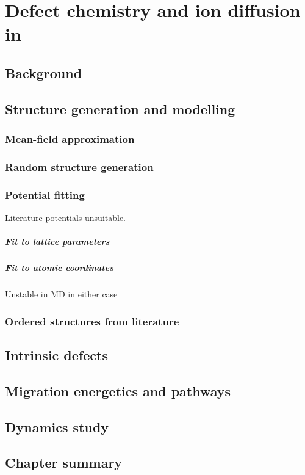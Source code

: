 \chapter{Defect chemistry and  ion diffusion in }
\section{Background}

\section{Structure generation and modelling}
\subsection{Mean-field approximation}

\subsection{Random structure generation}
\subsection{Potential fitting}
Literature potentials unsuitable.
\paragraph{Fit to lattice parameters}
\paragraph{Fit to atomic coordinates}
Unstable in MD in either case

\subsection{Ordered structures from literature}

\section{Intrinsic defects}

\section{Migration energetics and pathways}

\section{Dynamics study}

\section{Chapter summary}